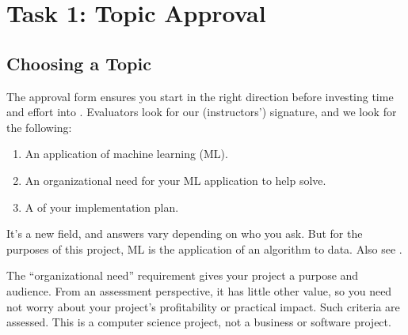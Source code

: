\documentclass[letterpaper,10pt,english]{jupyterBook}
\begin{document}
\sphinxstepscope


\chapter{Task 1: Topic Approval}
\label{\detokenize{task1:task-1-topic-approval}}\label{\detokenize{task1::doc}}\label{\detokenize{task1:task1}}





\section{Choosing a Topic}
\label{\detokenize{task1:choosing-a-topic}}\label{\detokenize{task1:task1-choosing-a-topic}}
\sphinxAtStartPar
The approval form ensures you start in the right direction before investing time and effort into {\hyperref[\detokenize{task2_c/task2_part_c:task2-part-c}]{}}. Evaluators look for our (instructors’) signature, and we look for the following:
\begin{enumerate}
%
\item {} 
\sphinxAtStartPar
An application of machine learning (ML).

\item {} 
\sphinxAtStartPar
An organizational need for your ML application to help solve.

\item {} 
\sphinxAtStartPar
A  of your implementation plan.

\end{enumerate}

\begin{sphinxShadowBox}

\sphinxAtStartPar
It’s a new field, and answers vary depending on who you ask. But for the purposes of this project, ML is the application of an algorithm to data. Also see {\hyperref[\detokenize{task2_c/task2_part_c:task1-faq-what-is-machine-learning}]{}}.
\end{sphinxShadowBox}

\sphinxAtStartPar
The “organizational need” requirement gives your project a purpose and audience. From an assessment perspective, it has little other value, so you need not worry about your project’s profitability or practical impact. Such criteria are  assessed. This is a computer science project, not a business or software project.
\end{document}
